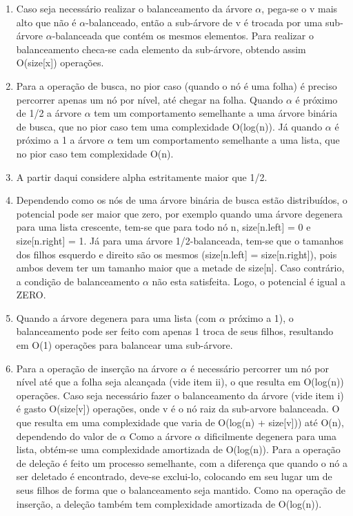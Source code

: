 \documentclass[
	12pt,				%
	oneside,			%
	a4paper,			%
	english,			%
	french,				%
	spanish,			%
	brazil,				%
	]{abntex2}
\begin{document}
\begin{enumerate}
  \item Caso seja necessário realizar o balanceamento da árvore $\alpha$, pega-se o \textsf{v} mais alto que não é $\alpha$-balanceado, então a sub-árvore de \textsf{v} é trocada por uma sub-árvore $\alpha$-balanceada que contém os mesmos elementos. Para realizar o balanceamento checa-se cada elemento da sub-árvore, obtendo assim O(size[x]) operações. 
  \item Para a operação de busca, no pior caso (quando o nó é uma folha) é preciso percorrer apenas um nó por nível, até chegar na folha. Quando $\alpha$ é próximo de 1/2 a árvore $\alpha$ tem um comportamento semelhante a uma árvore binária de busca, que no pior caso tem uma complexidade O(log(n)). Já quando $\alpha$ é próximo a 1 a árvore $\alpha$ tem um comportamento semelhante a uma lista, que no pior caso tem complexidade O(n).  
  \item A partir daqui considere alpha estritamente maior que 1/2.
  \item Dependendo como os nós de uma árvore binária de busca estão distribuídos, o potencial pode ser maior que zero, por exemplo quando uma árvore degenera para uma lista crescente, tem-se que para todo nó \textsf{n}, size[n.left] = 0 e size[n.right] = 1. Já para uma árvore 1/2-balanceada, tem-se que o tamanhos dos filhos esquerdo e direito são os mesmos (size[n.left] = size[n.right]), pois ambos devem ter um tamanho maior que a metade de size[n]. Caso contrário, a condição de balanceamento $\alpha$ não esta satisfeita. Logo, o potencial é igual a ZERO.
  \item Quando a árvore degenera para uma lista (com $\alpha$ próximo a 1), o balanceamento pode ser feito com apenas 1 troca de seus filhos, resultando em O(1) operações para balancear uma sub-árvore.
  \item Para a operação de inserção na árvore $\alpha$ é necessário percorrer um nó por nível até que a folha seja alcançada (vide item ii), o que resulta em O(log(n)) operações. Caso seja necessário fazer o balanceamento da árvore (vide item i) é gasto O(size[v]) operações, onde \textsf{v} é o nó raiz da sub-arvore balanceada. O que resulta em uma complexidade que varia de O(log(n) + size[v])) até O(n), dependendo do valor de $\alpha$ Como a árvore $\alpha$ dificilmente degenera para uma lista, obtém-se uma complexidade amortizada de O(log(n)). Para a operação de deleção é feito um processo semelhante, com a diferença que quando o nó a ser deletado é encontrado, deve-se exclui-lo, colocando em seu lugar um de seus filhos de forma que o balanceamento seja mantido. Como na operação de inserção, a deleção também tem complexidade amortizada de O(log(n)).  
\end{enumerate}
\end{document}
